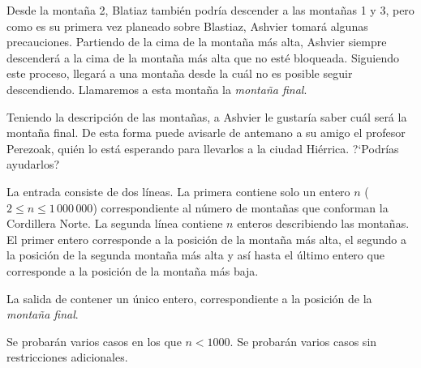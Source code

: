 \documentclass{oci}
\begin{document}
\begin{problemDescription}
Desde la montaña 2, Blatiaz también podría descender a las montañas 1 y 3,
pero como es su primera vez planeado sobre Blastiaz, Ashvier tomará algunas precauciones.
Partiendo de la cima de la montaña más alta, Ashvier siempre descenderá a la cima de la montaña más
alta que no esté bloqueada.
Siguiendo este proceso, llegará a una montaña desde la cuál no es posible seguir descendiendo.
Llamaremos a esta montaña la \emph{montaña final}.

Teniendo la descripción de las montañas, a Ashvier le gustaría saber cuál será la
montaña final.
De esta forma puede avisarle de antemano a su amigo el profesor Perezoak, quién lo está
esperando para llevarlos a la ciudad Hiérrica.
?`Podrías ayudarlos?




\end{problemDescription}

\begin{inputDescription}

La entrada consiste de dos líneas.
La primera contiene solo un entero $n$ ($2 \leq n \leq 1\,000\,000$)
correspondiente al número de montañas que conforman la Cordillera Norte.
La segunda línea contiene $n$ enteros describiendo las montañas.
El primer entero corresponde a la posición de la montaña más alta, el segundo a la posición
de la segunda montaña más alta y así hasta el último entero que corresponde a la posición
de la montaña más baja.

\end{inputDescription}

\begin{outputDescription}
La salida de contener un único entero, correspondiente a la posición de la \emph{montaña final}.
\end{outputDescription}

\begin{scoreDescription}
  Se probarán varios casos en los que $n<1000$.
  Se probarán varios casos sin restricciones adicionales.
\end{scoreDescription}

\begin{sampleDescription}
\end{sampleDescription}
\end{document}
